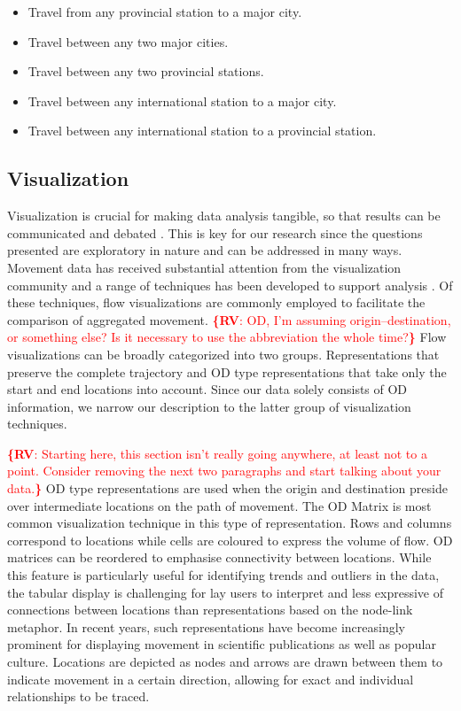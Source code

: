 \documentclass{sig-alternate}
\newcommand{\rv}[1]{\noindent\textcolor{red}{{\bf \{RV}: #1{\bf \}}}}
\begin{document}
\begin{itemize}
  \item Travel from any provincial station to a major city.
  \item Travel between any two major cities.
  \item Travel between any two provincial stations.
  \item Travel between any international station to a major city.
  \item Travel between any international station to a provincial station.
\end{itemize}

\subsection{Visualization}

Visualization is crucial for making data analysis tangible, so that results can be communicated and debated \cite{robinson2008collaborative}. 
This is key for our research since the questions presented are exploratory in nature \cite{kraak2008exploratory} and can be addressed in many ways. 
Movement data has received substantial attention from the visualization community and a range of techniques has been developed to support analysis \cite{andrienko2012visual}. 
Of these techniques, flow visualizations are commonly employed to facilitate the comparison of aggregated movement. 
\rv{OD, I'm assuming origin--destination, or something else? Is it necessary to use the abbreviation the whole time?}
Flow visualizations can be broadly categorized into two groups. Representations that preserve the complete trajectory and OD type representations that take only the start and end locations into account.
Since our data solely consists of OD information, we narrow our description to the latter group of visualization techniques.

\rv{Starting here, this section isn't really going anywhere, at least not to a point. Consider removing the next two paragraphs and start talking about your data.}
OD type representations are used when the origin and destination preside over intermediate locations on the path of movement. 
The OD Matrix is most common visualization technique in this type of representation. 
Rows and columns correspond to locations while cells are coloured to express the volume of flow.
OD matrices can be reordered to emphasise connectivity between locations.
While this feature is particularly useful for identifying trends and outliers in the data, the tabular display is challenging for lay users to interpret and less expressive of connections between locations than representations based on the node-link metaphor.
In recent years, such representations have become increasingly prominent for  displaying movement in scientific publications as well as popular culture.
Locations are depicted as nodes and arrows are drawn between them to indicate movement in a certain direction, allowing for exact and individual relationships to be traced.
\end{document}
